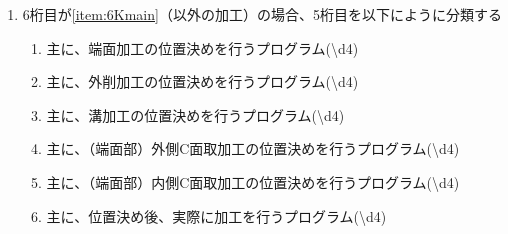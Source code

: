 \begin{enumerate}[label=\alph*)]
\item 6桁目が\ref{item:6Kmain}（\Dimple 以外の加工）の場合、5桁目を以下にように分類する
  \begin{enumerate}[label=\arabic*., ref=\arabic*, start=1]
  \item%
    主に、端面加工の位置決めを行うプログラム({\textbackslash d{4}})
  \item\label{item:5KO} 主に、外削加工の位置決めを行うプログラム({\textbackslash d{4}})
  \item%
    主に、溝加工の位置決めを行うプログラム({\textbackslash d{4}})
  \item%
    主に、（端面部）外側C面取加工の位置決めを行うプログラム({\textbackslash d{4}})
  \item%
    主に、（端面部）内側C面取加工の位置決めを行うプログラム({\textbackslash d{4}})
  \setcounter{enumii}{8}
  \item 主に、位置決め後、実際に加工を行うプログラム({\textbackslash d{4}})
  \end{enumerate}
\end{enumerate}


